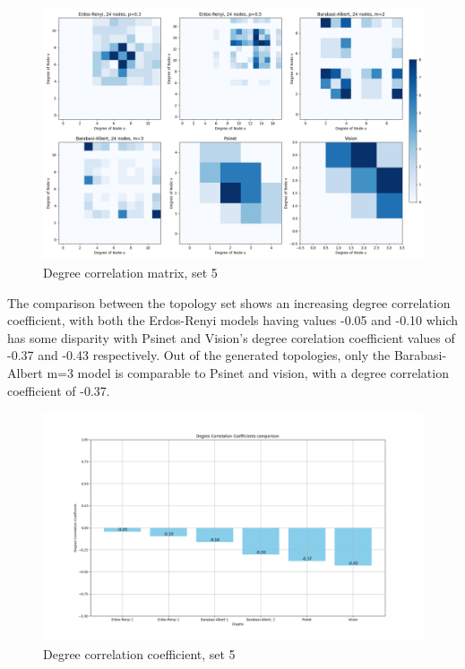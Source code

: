 \begin{figure}
    \centering
    \includegraphics[width=0.9\linewidth]{images/FINAL-TOPO-COMP/Degree-correlation-matrices/24-matrix.png}
    \caption{Degree correlation matrix, set 5}
    \label{fig:enter-label}
\end{figure}

The comparison between the topology set shows an increasing degree correlation coefficient, with both the Erdos-Renyi models having values -0.05 and -0.10 which has some disparity with Psinet and Vision's degree corelation coefficient values of -0.37 and -0.43 respectively. Out of the generated topologies, only the Barabasi-Albert m=3 model is comparable to Psinet and vision, with a degree correlation coefficient of -0.37. 
\begin{figure}
    \centering
    \includegraphics[width=0.9\linewidth]{images/FINAL-TOPO-COMP/Degree-correlation-coeff/deg-coeff-24.png}
    \caption{Degree correlation coefficient, set 5}
    \label{fig:enter-label}
\end{figure}

